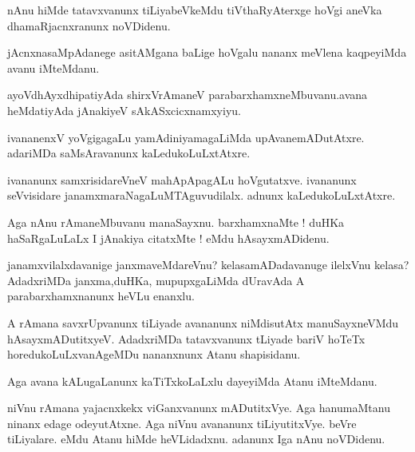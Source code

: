 \documentclass{article}
\begin{document}
\begin{mn}%
nAnu hiMde tatavxvanunx tiLiyabeVkeMdu tiVthaRyAterxge hoVgi aneVka dhamaRjacnxranunx 
noVDidenu.
\end{mn}

\begin{mn}%
jAcnxnasaMpAdanege asitAMgana baLige hoVgalu nananx meVlena kaqpeyiMda avanu iMteMdanu.
\end{mn}

\begin{mn}%
ayoVdhAyxdhipatiyAda shirxVrAmaneV parabarxhamxneMbuvanu.avana heMdatiyAda jAnakiyeV 
sAkASxcicxnamxyiyu.
\end{mn}

\begin{mn}%
ivananenxV yoVgigagaLu yamAdiniyamagaLiMda upAvanemADutAtxre. adariMDa saMsAravanunx 
kaLedukoLuLxtAtxre.
\end{mn}

\begin{mn}%
ivananunx samxrisidareVneV mahApApagALu hoVgutatxve. ivananunx seVvisidare 
janamxmaraNagaLuMTAguvudilalx. adnunx kaLedukoLuLxtAtxre.
\end{mn}

\begin{mn}%
Aga nAnu rAmaneMbuvanu manaSayxnu. barxhamxnaMte ! duHKa haSaRgaLuLaLx I jAnakiya 
citatxMte ! eMdu hAsayxmADidenu. 
\end{mn}

\begin{mn}%
janamxvilalxdavanige janxmaveMdareVnu? kelasamADadavanuge ilelxVnu kelasa? AdadxriMDa 
janxma,duHKa, mupupxgaLiMda dUravAda A parabarxhamxnanunx heVLu enanxlu.
\end{mn}

\begin{mn}%
A rAmana savxrUpvanunx tiLiyade avananunx niMdisutAtx manuSayxneVMdu hAsayxmADutitxyeV. 
AdadxriMDa tatavxvanunx tLiyade bariV hoTeTx horedukoLuLxvanAgeMDu nananxnunx Atanu 
shapisidanu.
\end{mn}

\begin{mn}%
Aga avana kALugaLanunx kaTiTxkoLaLxlu dayeyiMda Atanu iMteMdanu.
\end{mn}

\begin{mn}%
niVnu rAmana yajacnxkekx viGanxvanunx mADutitxVye. Aga hanumaMtanu ninanx edage 
odeyutAtxne. Aga niVnu avananunx tiLiyutitxVye. beVre tiLiyalare. eMdu Atanu hiMde 
heVLidadxnu. adanunx Iga nAnu noVDidenu.
\end{mn}
\end{document}
